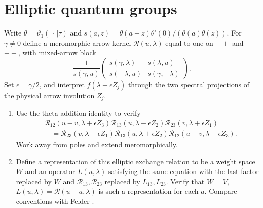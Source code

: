 \section{Elliptic quantum groups}

\begin{exercise}
Write $\theta=\vartheta_1(\,\cdot\,|\tau)$ and
$s(a,z)=\theta(a-z)\theta'(0)/(\theta(a)\theta(z))$.
For $\gamma\ne0$ define a meromorphic arrow kernel
$\mathcal R(u,\lambda)$ equal to one on $++$ and $--$,
with mixed-arrow block
\[
 \frac1{s(\gamma,u)}
 \begin{pmatrix}s(\gamma,\lambda)&s(\lambda,u)\\
                 s(-\lambda,u)&s(\gamma,-\lambda)\end{pmatrix}.
\]
Set $\epsilon=\gamma/2$, and interpret
$f(\lambda+\epsilon Z_j)$ through the two spectral projections
of the physical arrow involution $Z_j$.
\begin{enumerate}[label=(\alph*)]
\item Use the theta addition identity to verify
\[
\begin{split}
 &\mathcal R_{12}(u-v,\lambda+\epsilon Z_3)
 \mathcal R_{13}(u,\lambda-\epsilon Z_2)
 \mathcal R_{23}(v,\lambda+\epsilon Z_1)\\
 &\quad=\mathcal R_{23}(v,\lambda-\epsilon Z_1)
 \mathcal R_{13}(u,\lambda+\epsilon Z_2)
 \mathcal R_{12}(u-v,\lambda-\epsilon Z_3).
\end{split}
\]
Work away from poles and extend meromorphically.
\item Define a representation of this elliptic exchange
relation to be a weight space $W$ and an operator $L(u,\lambda)$
satisfying the same equation with the last factor replaced by
$W$ and $\mathcal R_{13},\mathcal R_{23}$ replaced by $L_{13},L_{23}$.
Verify that $W=V$, $L(u,\lambda)=\mathcal R(u-a,\lambda)$
is such a representation for each $a$.
Compare conventions with Felder \cite{felder-elliptic}.
\end{enumerate}
\end{exercise}


